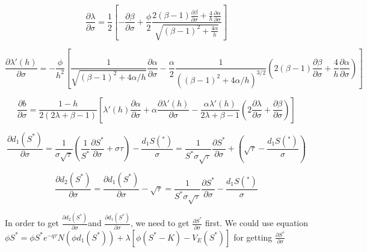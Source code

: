 \documentclass[preprint,12pt,1p]{elsarticle}
\begin{document}
\begin{spacing}{1.3}
$$\frac{\partial \lambda}{\partial \sigma} = \frac{1}{2}\left[- \frac{\partial \beta}{\partial \sigma} +\frac{\phi}{2} \frac{2(\beta-1) \frac{\partial \beta}{\partial \sigma} + \frac{4}{h} \frac{\partial \alpha}{\partial \sigma} }{\sqrt{(\beta-1)^2 + \frac{4 \alpha}{h}}}\right]$$

$$\frac{\partial \lambda'(h)}{\partial \sigma} = -\frac{\phi}{h^2} \left[\frac{1}{\sqrt{(\beta-1)^2 + 4\alpha/h}} \frac{\partial \alpha}{\partial \sigma} - \frac{\alpha}{2} \frac{1}{((\beta-1)^2 + 4\alpha/h)^{3/2}} \left(2(\beta-1)\frac{\partial \beta}{\partial \sigma} + \frac{4}{h} \frac{\partial \alpha}{\partial \sigma} \right) \right]$$

$$\frac{\partial b}{\partial \sigma} = \frac{1-h}{2(2\lambda + \beta -1)} \left[\lambda'(h) \frac{\partial \alpha}{\partial \sigma} + \alpha \frac{\partial \lambda'(h)}{\partial \sigma} - \frac{\alpha \lambda'(h)}{2\lambda + \beta -1} \left(2 \frac{\partial \lambda}{\partial \sigma} + \frac{\partial \beta}{\partial \sigma}\right) \right]$$

$$\frac{\partial d_1(S^*)}{\partial \sigma} = \frac{1}{\sigma \sqrt{\tau}} (\frac{1}{S^*} \frac{\partial S^*}{\partial \sigma} +\sigma \tau) - \frac{d_1S(^*)}{\sigma}=\frac{1}{S^*\sigma \sqrt{\tau}}\frac{\partial S^*}{\partial \sigma} + (\sqrt{\tau} - \frac{d_1S(^*)}{\sigma})$$

$$\frac{\partial d_2(S^*)}{\partial \sigma} = \frac{\partial d_1(S^*)}{\partial \sigma} - \sqrt{\tau} = \frac{1}{S^*\sigma \sqrt{\tau}}\frac{\partial S^*}{\partial \sigma}  - \frac{d_1S(^*)}{\sigma}$$

In order to get $\frac{\partial d_2(S^*)}{\partial \sigma} $and $\frac{\partial d_1(S^*)}{\partial \sigma} $, we need to get $\frac{\partial S^*}{\partial \sigma}$ first. We could use equation $\phi S^* = \phi S^* e^{-q\tau}N(\phi d_1(S^*)) + \lambda[\phi (S^*-K) - V_E(S^*)]$ for getting $\frac{\partial S^*}{\partial \sigma}$


\end{spacing}
\end{document}
